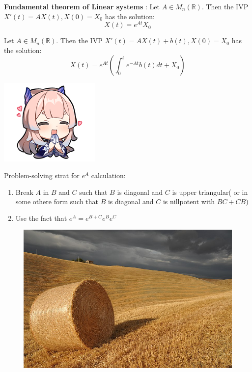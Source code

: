 \documentclass{tufte-book}
\begin{document}
\begin{tcolorbox}[colback=blue!8!white]
	\textbf{Fundamental theorem of Linear systems }: Let $A\in M_n(\mathbb R)$. Then the IVP $X'(t)=AX(t),X(0)=X_0$ has the solution:
	$$X(t)=e^{At}X_0$$
\end{tcolorbox}
\begin{tcolorbox}[colback=blue!8!white]
	Let $A\in M_n(\mathbb R)$. Then the IVP $X'(t)=AX(t)+b(t),X(0)=X_0$ has the solution:
	$$X(t)=e^{At}\left(\int_0^t e^{-At}b(t)dt+X_0\right)$$
\end{tcolorbox}
\begin{marginfigure}
	\includegraphics{7.png}
\end{marginfigure}
Problem-solving strat for $e^A$ calculation:
\begin{enumerate}
	\item Break $A$ in $B$ and $C$ such that $B$ is diagonal and $C$ is upper triangular( or in some othere form such that $B$ is diagonal and $C$ is nillpotent with $BC+CB$)
	\item Use the fact that $e^A=e^{B+C}e^Be^C$
\end{enumerate}
\begin{figure}
	\includegraphics{2-2.jpg}
\end{figure}
\end{document}
